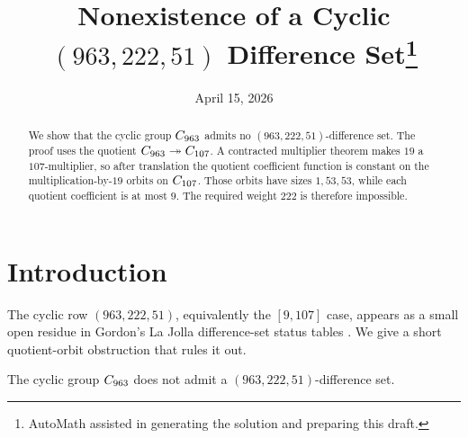 \documentclass[11pt]{amsart}
\begin{document}
\title[Nonexistence of a Cyclic $(963,222,51)$ Difference Set]{Nonexistence of a Cyclic $(963,222,51)$ Difference Set\thanks{AutoMath assisted in generating the solution and preparing this draft.}}
\date{April 15, 2026}

\begin{abstract}
We show that the cyclic group $C_{963}$ admits no $(963,222,51)$-difference set.
The proof uses the quotient $C_{963}\twoheadrightarrow C_{107}$.
A contracted multiplier theorem makes $19$ a $107$-multiplier, so after translation the quotient coefficient function is constant on the multiplication-by-$19$ orbits on $C_{107}$.
Those orbits have sizes $1,53,53$, while each quotient coefficient is at most $9$.
The required weight $222$ is therefore impossible.
\end{abstract}

\maketitle

\section{Introduction}
The cyclic row $(963,222,51)$, equivalently the $[9,107]$ case, appears as a small open residue in Gordon's La Jolla difference-set status tables \cite{Gordon2019}.
We give a short quotient-orbit obstruction that rules it out.

\begin{theorem}
The cyclic group $C_{963}$ does not admit a $(963,222,51)$-difference set.
\end{theorem}
\end{document}
